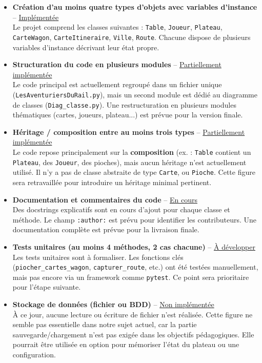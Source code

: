 \begin{itemize}
    \item \textbf{Création d’au moins quatre types d’objets avec variables d’instance} – \underline{Implémentée} \\
    Le projet comprend les classes suivantes : \texttt{Table}, \texttt{Joueur}, \texttt{Plateau}, \texttt{CarteWagon}, \texttt{CarteItineraire}, \texttt{Ville}, \texttt{Route}. Chacune dispose de plusieurs variables d’instance décrivant leur état propre.

    \item \textbf{Structuration du code en plusieurs modules} – \underline{Partiellement implémentée} \\
    Le code principal est actuellement regroupé dans un fichier unique (\texttt{LesAventuriersDuRail.py}), mais un second module est dédié au diagramme de classes (\texttt{Diag\_classe.py}). Une restructuration en plusieurs modules thématiques (cartes, joueurs, plateau...) est prévue pour la version finale.

    \item \textbf{Héritage / composition entre au moins trois types} – \underline{Partiellement implémentée} \\
    Le code repose principalement sur la \textbf{composition} (ex. : \texttt{Table} contient un \texttt{Plateau}, des \texttt{Joueur}, des pioches), mais aucun héritage n'est actuellement utilisé. Il n’y a pas de classe abstraite de type \texttt{Carte}, ou \texttt{Pioche}. Cette figure sera retravaillée pour introduire un héritage minimal pertinent.

    \item \textbf{Documentation et commentaires du code} – \underline{En cours} \\
    Des docstrings explicatifs sont en cours d’ajout pour chaque classe et méthode. Le champ \texttt{:author:} est prévu pour identifier les contributeurs. Une documentation complète est prévue pour la livraison finale.

    \item \textbf{Tests unitaires (au moins 4 méthodes, 2 cas chacune)} – \underline{À développer} \\
    Les tests unitaires sont à formaliser. Les fonctions clés (\texttt{piocher\_cartes\_wagon}, \texttt{capturer\_route}, etc.) ont été testées manuellement, mais pas encore via un framework comme \texttt{pytest}. Ce point sera prioritaire pour l’étape suivante.

    \item \textbf{Stockage de données (fichier ou BDD)} – \underline{Non implémentée} \\
    À ce jour, aucune lecture ou écriture de fichier n’est réalisée. Cette figure ne semble pas essentielle dans notre sujet actuel, car la partie sauvegarde/chargement n’est pas exigée dans les objectifs pédagogiques. Elle pourrait être utilisée en option pour mémoriser l’état du plateau ou une configuration.

\end{itemize}

